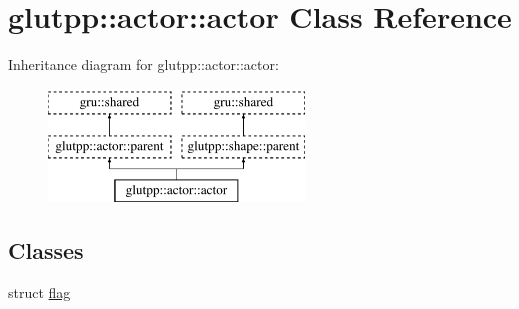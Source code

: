 \hypertarget{classglutpp_1_1actor_1_1actor}{\section{glutpp\-:\-:actor\-:\-:actor \-Class \-Reference}
\label{classglutpp_1_1actor_1_1actor}
}
\-Inheritance diagram for glutpp\-:\-:actor\-:\-:actor\-:\begin{figure}[H]
\begin{center}
\leavevmode
\includegraphics[height=3.000000cm]{classglutpp_1_1actor_1_1actor}
\end{center}
\end{figure}
\subsection*{\-Classes}
\begin{DoxyCompactItemize}
\item 
struct \hyperlink{structglutpp_1_1actor_1_1actor_1_1flag}{flag}
\end{DoxyCompactItemize}
